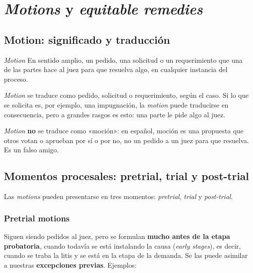 \documentclass[12pt,oneside]{book}
\begin{document}
\chapter[Motions y equitable remedies]{\textit{Motions} y \textit{equitable remedies}}

\section{Motion: significado y traducción}

\begin{definition}{\textit{Motion}}
En sentido amplio, un pedido, una solicitud o un requerimiento que una de las partes hace al juez para que resuelva algo, en cualquier instancia del proceso.
\end{definition}

\textit{Motion} se traduce como pedido, solicitud o requerimiento, según el caso. Si lo que se solicita es, por ejemplo, una impugnación, la \textit{motion} puede traducirse en consecuencia, pero a grandes rasgos es esto: una parte le pide algo al juez.

\begin{important}
\textit{Motion} \textbf{no} se traduce como «moción»: en español, moción es una propuesta que otros votan o aprueban por sí o por no, no un pedido a un juez para que resuelva. Es un falso amigo.
\end{important}

\section{Momentos procesales: pretrial, trial y post-trial}

Las \textit{motions} pueden presentarse en tres momentos: \textit{pretrial}, \textit{trial} y \textit{post-trial}.

\subsection{Pretrial motions}

Siguen siendo pedidos al juez, pero se formulan \textbf{mucho antes de la etapa probatoria}, cuando todavía se está instalando la causa (\textit{early stages}), es decir, cuando se traba la litis y se está en la etapa de la demanda. Se las puede asimilar a nuestras \textbf{excepciones previas}. Ejemplos:
\end{document}
